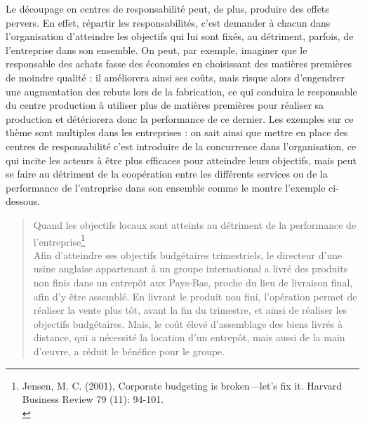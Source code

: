 \documentclass{tufte-handout}
\begin{document}
\begin{enumerate}
Le découpage en centres de responsabilité peut, de plus, produire des effets pervers. En effet, répartir les responsabilités, c’est demander à chacun dans l’organisation d’atteindre les objectifs qui lui sont fixés, au détriment, parfois, de l’entreprise dans son ensemble. On peut, par exemple, imaginer que le responsable des achats fasse des économies en choisissant des matières premières de moindre qualité : il améliorera ainsi ses coûts, mais risque alors d’engendrer une augmentation des rebuts lors de la fabrication, ce qui conduira le responsable du centre production à utiliser plus de matières premières pour réaliser sa production et détériorera donc la performance de ce dernier. Les exemples sur ce thème sont multiples dans les entreprises : on sait ainsi que mettre en place des centres de responsabilité c’est introduire de la concurrence dans l’organisation, ce qui incite les acteurs à être plus efficaces pour atteindre leurs objectifs, mais peut se faire au détriment de la coopération entre les différents services ou de la performance de l’entreprise dans son ensemble comme le montre l’exemple ci-dessous.\\

\begin{verse}
Quand les objectifs locaux sont atteints au détriment de la performance de l’entreprise\footnote{Jensen, M. C. (2001), Corporate budgeting is broken—let's fix it. Harvard Business Review 79 (11): 94-101.\\}\\
Afin d’atteindre ses objectifs budgétaires trimestriels, le directeur d’une usine anglaise appartenant à un groupe international a livré des produits non finis dans un entrepôt aux Pays-Bas, proche du lieu de livraison final, afin d’y être assemblé. En livrant le produit non fini, l’opération permet de réaliser la vente plus tôt, avant la fin du trimestre, et ainsi de réaliser les objectifs budgétaires. Mais, le coût élevé d’assemblage des biens livrés à distance, qui a nécessité la location d’un entrepôt, mais aussi de la main d’œuvre, a réduit le bénéfice pour le groupe.\\
\end{verse}


\end{enumerate}
\end{document}
